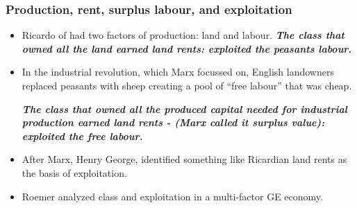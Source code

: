 \documentclass[notes]{beamer}
\begin{document}
%
%
%
%
%
%
\begin{frame}\frametitle{Production, rent, surplus labour, and exploitation}%
\begin{itemize}
\item Ricardo of had two factors of production: land and labour. 
\textbf{\textit {The class that owned all the land earned land rents: exploited the peasants labour.}}

\item  In the industrial revolution, which Marx focussed on, English landowners replaced peasants with sheep creating a pool of ``free labour'' that was cheap. %

\textbf{\textit {The class that owned all the produced capital needed for industrial production earned land rents - (Marx called it surplus value): exploited the free labour.}}

\item After Marx, Henry George, identified something like Ricardian land rents as the basis of exploitation.
\item Roemer analyzed class and exploitation in a multi-factor GE economy. 
\end {itemize}
\end{frame}
\end{document}
